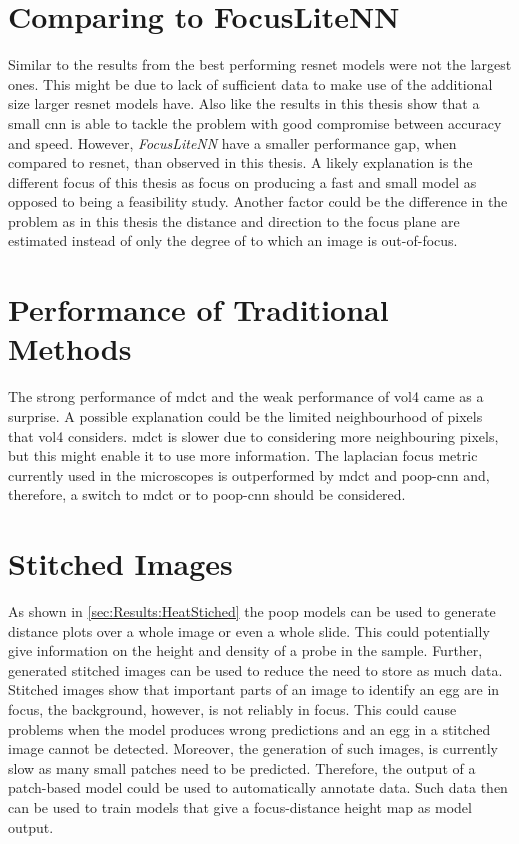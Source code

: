 \section{Comparing to FocusLiteNN}
\label{ch:Discussion:FocusLiteNN}

Similar to the results from \textcite{wang2020focuslitenn} the best performing \ac{resnet} models were not the largest ones. This might be due to lack of sufficient data to make use of the additional size larger \ac{resnet} models have. Also like \citeauthor{wang2020focuslitenn} the results in this thesis show that a small \ac{cnn} is able to tackle the problem with good compromise between accuracy and speed. However, \citeauthor{wang2020focuslitenn} \textit{FocusLiteNN} have a smaller performance gap, when compared to \ac{resnet}, than observed in this thesis. A likely explanation is the different focus of this thesis as \citeauthor{wang2020focuslitenn} focus on producing a fast and small model as opposed to being a feasibility study. Another factor could be the difference in the problem as in this thesis the distance and direction to the focus plane are estimated instead of only the degree of to which an image is out-of-focus.

\section{Performance of Traditional Methods}
\label{ch:Discussion:PerformanceTraditional}

The strong performance of \ac{mdct} and the weak performance of \ac{vol4} came as a surprise. A possible explanation could be the limited neighbourhood of pixels that \ac{vol4} considers. \Ac{mdct} is slower due to considering more neighbouring pixels, but this might enable it to use more information. The \Ac{laplacian} focus metric currently used in the microscopes is outperformed by \ac{mdct} and \ac{poop}-\ac{cnn} and, therefore, a switch to \ac{mdct} or to \ac{poop}-\ac{cnn} should be considered.

\section{Stitched Images}
\label{ch:Discussion:StitchedImages}

As shown in \autoref{sec:Results:HeatStiched} the \ac{poop} models can be used to generate distance plots over a whole image or even a whole slide. This could potentially give information on the height and density of a probe in the sample. Further, generated stitched images can be used to reduce the need to store as much data. Stitched images show that important parts of an image to identify an egg are in focus, the background, however, is not reliably in focus. This could cause problems when the model produces wrong predictions and an egg in a stitched image cannot be detected. Moreover, the generation of such images, is currently slow as many small patches need to be predicted. Therefore, the output of a patch-based model could be used to automatically annotate data. Such data then can be used to train models that give a focus-distance height map as model output.

